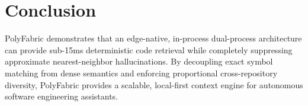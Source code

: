 \documentclass[10pt,journal,compsoc]{IEEEtran}
\begin{document}
\section{Conclusion}
PolyFabric demonstrates that an edge-native, in-process dual-process architecture can provide sub-15ms deterministic code retrieval while completely suppressing approximate nearest-neighbor hallucinations. By decoupling exact symbol matching from dense semantics and enforcing proportional cross-repository diversity, PolyFabric provides a scalable, local-first context engine for autonomous software engineering assistants.



\end{document}
